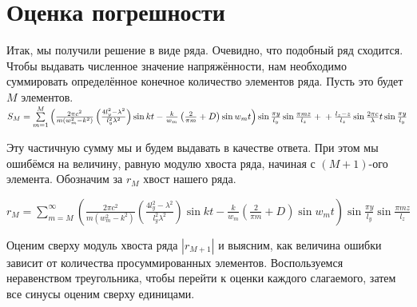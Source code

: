 \chapter{Оценка погрешности}

Итак, мы получили решение в виде ряда. Очевидно, что подобный ряд сходится. Чтобы выдавать численное значение напряжённости, нам необходимо суммировать определённое конечное количество элементов ряда. Пусть это будет $M$ элементов.
$S_M = \sum \limits_{m=1}^{M} \left( \frac{2\pi c^2}{m(w_m^2 - k^2)}\left(\frac{4l_y^2 - \lambda^2}{l_y^2\lambda^2} \right)\sin{kt} - \frac{k}{w_m}\left(\frac{2}{\pi m} + D\right)\sin{w_mt} \right) \sin\frac{\pi y}{l_y} \sin\frac{\pi m z}{l_z} + \\
    + \frac{l_z - z}{l_z} \sin\frac{2\pi c}{\lambda}t \sin\frac{\pi y}{l_y}$

Эту частичную сумму мы и будем выдавать в качестве ответа. При этом мы ошибёмся на величину, равную модулю хвоста ряда, начиная с $(M+1)$-ого элемента. Обозначим за $r_M$ хвост нашего ряда.

$r_M = \sum \limits_{m=M}^{\infty} \left( \frac{2\pi c^2}{m(w_m^2 - k^2)}\left(\frac{4l_y^2 - \lambda^2}{l_y^2\lambda^2} \right)\sin{kt} - \frac{k}{w_m}\left(\frac{2}{\pi m} + D\right)\sin{w_mt} \right) \sin\frac{\pi y}{l_y} \sin\frac{\pi m z}{l_z}$

Оценим сверху модуль хвоста ряда $|r_{M+1}|$ и выясним, как величина ошибки зависит от количества просуммированных элементов. Воспользуемся неравенством треугольника, чтобы перейти к оценки каждого слагаемого, затем все синусы оценим сверху единицами.

